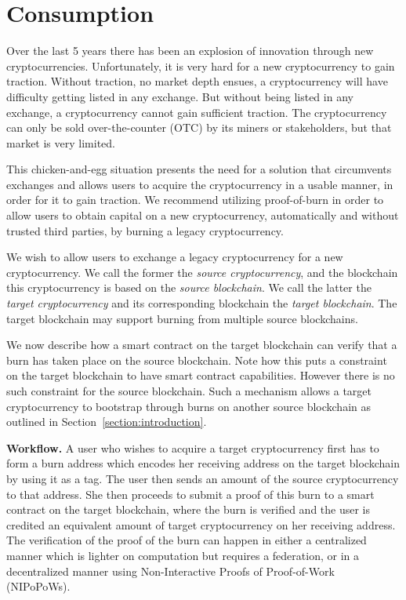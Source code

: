 \section{Consumption}

Over the last 5 years there has been an explosion of innovation through new cryptocurrencies. Unfortunately, it is very hard for a new cryptocurrency to gain traction. Without traction, no market depth ensues, a cryptocurrency will have difficulty getting listed in any exchange. But without being listed in any exchange, a cryptocurrency cannot gain sufficient traction. The cryptocurrency can only be sold over-the-counter (OTC) by its miners or stakeholders, but that market is very limited.

This chicken-and-egg situation presents the need for a solution that circumvents exchanges and allows users to acquire the cryptocurrency in a usable manner, in order for it to gain traction. We recommend utilizing proof-of-burn in order to allow users to obtain capital on a new cryptocurrency, automatically and without trusted third parties, by burning a legacy cryptocurrency.

We wish to allow users to exchange a legacy cryptocurrency for a new cryptocurrency. We call the former the \emph{source cryptocurrency}, and the blockchain this cryptocurrency is based on the \emph{source blockchain}. We call the latter the \emph{target cryptocurrency} and its corresponding blockchain the \emph{target blockchain}. The target blockchain may support burning from multiple source blockchains.

We now describe how a smart contract on the target blockchain can verify that a burn has taken place on the source blockchain. Note how this puts a constraint on the target blockchain to have smart contract capabilities. However there is no such constraint for the source blockchain. Such a mechanism allows a target cryptocurrency to bootstrap through burns on another source blockchain as outlined in Section~\ref{section:introduction}.

\noindent
\textbf{Workflow.}
A user who wishes to acquire a target cryptocurrency first has to form a burn address which encodes her receiving address on the target blockchain by using it as a tag. The user then sends an amount of the source cryptocurrency to that address. She then proceeds to submit a proof of this burn to a smart contract on the target blockchain, where the burn is verified and the user is credited an equivalent amount of target cryptocurrency on her receiving address. The verification of the proof of the burn can happen in either a centralized manner which is lighter on computation but requires a federation, or in a decentralized manner using Non-Interactive Proofs of Proof-of-Work (NIPoPoWs).


